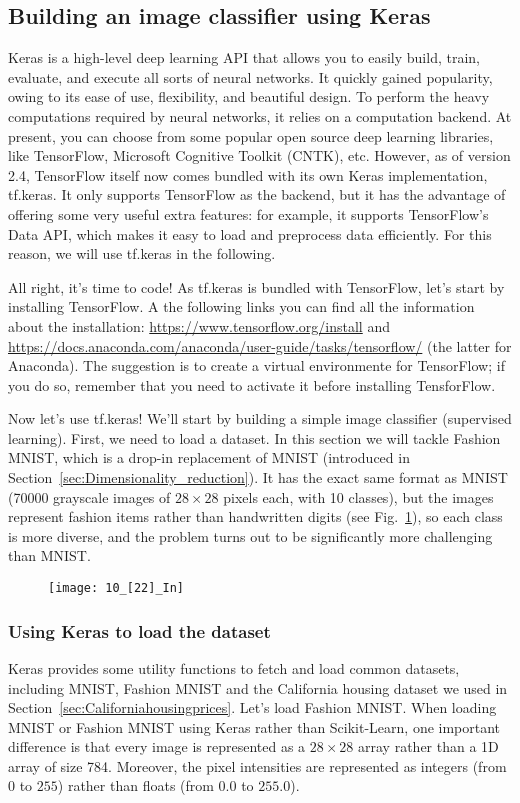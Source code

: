 \subsection{Building an image classifier using Keras}
Keras is a high-level deep learning API that allows you to easily build, train, evaluate, and execute all sorts of neural networks. It quickly gained popularity, owing to its ease of use, flexibility, and beautiful design. To perform the heavy computations required by neural networks, it relies on a computation backend. At present, you can choose from some popular open source deep learning libraries, like TensorFlow, Microsoft Cognitive Toolkit (CNTK), etc. However, as of version 2.4, TensorFlow itself now comes bundled with its own Keras implementation, tf.keras. It only supports TensorFlow as the backend, but it has the advantage of offering some very useful extra features: for example, it supports TensorFlow's Data API, which makes it easy to load and preprocess data efficiently. For this reason, we will use tf.keras in the following.

All right, it's time to code! As tf.keras is bundled with TensorFlow, let's start by installing TensorFlow. A the following links you can find all the information about the installation: \url{https://www.tensorflow.org/install} and \url{https://docs.anaconda.com/anaconda/user-guide/tasks/tensorflow/} (the latter for Anaconda). The suggestion is to create a virtual environmente for TensorFlow; if you do so, remember that you need to activate it before installing TensforFlow.

Now let's use tf.keras! We'll start by building a simple image classifier (supervised learning). First, we need to load a dataset. In this section we will tackle Fashion MNIST, which is a drop-in replacement of MNIST (introduced in Section~\ref{sec:Dimensionality_reduction}). It has the exact same format as MNIST (\num{70000} grayscale images of $28\times28$ pixels each, with 10 classes), but the images represent fashion items rather than handwritten digits (see Fig.~\ref{10_[22]_In}), so each class is more diverse, and the problem turns out to be significantly more challenging than MNIST.
\begin{figure}[h!t]
\centering
\texttt{[image: 10\_[22]\_In]}
\caption{}\label{10_[22]_In}
\end{figure}
\subsubsection{Using Keras to load the dataset}
Keras provides some utility functions to fetch and load common datasets, including MNIST, Fashion MNIST and the California housing dataset we used in Section~\ref{sec:Californiahousingprices}. Let's load Fashion MNIST. When loading MNIST or Fashion MNIST using Keras rather than Scikit-Learn, one important difference is that every image is represented as a $28\times28$ array rather than a 1D array of size 784. Moreover, the pixel intensities are represented as integers (from $0$ to $255$) rather than floats (from $0.0$ to $255.0$).

